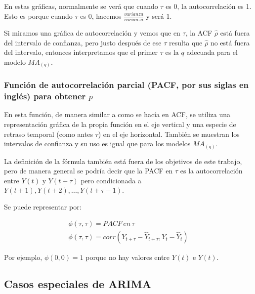 
En estas gráficas, normalmente se verá que cuando $\tau$ es 0, la autocorrelación es 1. Esto es porque cuando $\tau$ es 0, hacemos $\frac{varianza}{varianza}$ y será 1. 

Si miramos una gráfica de autocorrelación y vemos que en $\tau$, la ACF $\hat{\rho}$ está fuera del intervalo de confianza, pero justo después de ese $\tau$ resulta que $\hat{\rho}$ no está fuera del intervalo, entonces interpretamos que el primer $\tau$ es la $q$ adecuada para el modelo $MA_{(q)}$.


\subsubsection{Función de autocorrelación parcial (PACF, por sus siglas en inglés) para obtener $p$}

En esta función, de manera similar a como se hacía en ACF, se utiliza una representación gráfica de la propia función en el eje vertical y una especie de retraso temporal (como antes $\tau$) en el eje horizontal. También se muestran los intervalos de confianza y su uso es igual que para los modelos $MA_{(q)}$. 



La definición de la fórmula también está fuera de los objetivos de este trabajo, pero de manera general se podría decir que la PACF en $\tau$ es la autocorrelación entre $Y(t)$ y $Y(t+\tau)$ pero condicionada a $Y(t+1), Y(t+2), ... , Y(t+\tau-1)$.

Se puede representar por:

\begin{equation}
\begin{aligned}
	\phi(\tau, \tau) = PACF \,en \, \tau \\
	\phi(\tau, \tau) = corr(Y_{t+\tau} - \hat{Y}_{t+\tau}, Y_{t} - \hat{Y}_t)
\end{aligned}
\end{equation}

Por ejemplo, $\phi(0, 0) = 1$ porque no hay valores entre $Y(t)$ e $Y(t)$. 



\subsection{Casos especiales de ARIMA}

